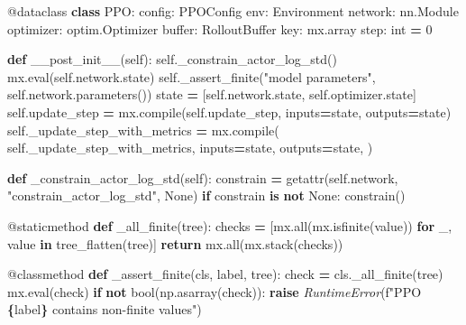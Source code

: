 \documentclass[
  chinese,
  11pt,
  letterpaper,
]{article}
\newenvironment{Shaded}{\begin{snugshade}}{\end{snugshade}}
\newcommand{\AttributeTok}[1]{\textcolor[rgb]{0.13,0.29,0.53}{#1}}
\newcommand{\BuiltInTok}[1]{#1}
\newcommand{\ControlFlowTok}[1]{\textcolor[rgb]{0.13,0.29,0.53}{\textbf{#1}}}
\newcommand{\DecValTok}[1]{\textcolor[rgb]{0.00,0.00,0.81}{#1}}
\newcommand{\KeywordTok}[1]{\textcolor[rgb]{0.13,0.29,0.53}{\textbf{#1}}}
\newcommand{\NormalTok}[1]{#1}
\newcommand{\OperatorTok}[1]{\textcolor[rgb]{0.81,0.36,0.00}{\textbf{#1}}}
\newcommand{\PreprocessorTok}[1]{\textcolor[rgb]{0.56,0.35,0.01}{\textit{#1}}}
\newcommand{\SpecialCharTok}[1]{\textcolor[rgb]{0.81,0.36,0.00}{\textbf{#1}}}
\newcommand{\SpecialStringTok}[1]{\textcolor[rgb]{0.31,0.60,0.02}{#1}}
\newcommand{\StringTok}[1]{\textcolor[rgb]{0.31,0.60,0.02}{#1}}
\newcommand{\VariableTok}[1]{\textcolor[rgb]{0.00,0.00,0.00}{#1}}
\renewenvironment{Shaded}{\par\smallskip}{\par\smallskip}
\begin{document}
\begin{Shaded}
\begin{Highlighting}[]
\AttributeTok{@dataclass}
\KeywordTok{class}\NormalTok{ PPO:}
\NormalTok{    config: PPOConfig}
\NormalTok{    env: Environment}
\NormalTok{    network: nn.Module}
\NormalTok{    optimizer: optim.Optimizer}
    \BuiltInTok{buffer}\NormalTok{: RolloutBuffer}
\NormalTok{    key: mx.array}
\NormalTok{    step: }\BuiltInTok{int} \OperatorTok{=} \DecValTok{0}

    \KeywordTok{def}\NormalTok{ \_\_post\_init\_\_(}\VariableTok{self}\NormalTok{):}
        \VariableTok{self}\NormalTok{.\_constrain\_actor\_log\_std()}
\NormalTok{        mx.}\BuiltInTok{eval}\NormalTok{(}\VariableTok{self}\NormalTok{.network.state)}
        \VariableTok{self}\NormalTok{.\_assert\_finite(}\StringTok{"model parameters"}\NormalTok{, }\VariableTok{self}\NormalTok{.network.parameters())}
\NormalTok{        state }\OperatorTok{=}\NormalTok{ [}\VariableTok{self}\NormalTok{.network.state, }\VariableTok{self}\NormalTok{.optimizer.state]}
        \VariableTok{self}\NormalTok{.update\_step }\OperatorTok{=}\NormalTok{ mx.}\BuiltInTok{compile}\NormalTok{(}\VariableTok{self}\NormalTok{.update\_step, inputs}\OperatorTok{=}\NormalTok{state, outputs}\OperatorTok{=}\NormalTok{state)}
        \VariableTok{self}\NormalTok{.\_update\_step\_with\_metrics }\OperatorTok{=}\NormalTok{ mx.}\BuiltInTok{compile}\NormalTok{(}
            \VariableTok{self}\NormalTok{.\_update\_step\_with\_metrics,}
\NormalTok{            inputs}\OperatorTok{=}\NormalTok{state,}
\NormalTok{            outputs}\OperatorTok{=}\NormalTok{state,}
\NormalTok{        )}

    \KeywordTok{def}\NormalTok{ \_constrain\_actor\_log\_std(}\VariableTok{self}\NormalTok{):}
\NormalTok{        constrain }\OperatorTok{=} \BuiltInTok{getattr}\NormalTok{(}\VariableTok{self}\NormalTok{.network, }\StringTok{"constrain\_actor\_log\_std"}\NormalTok{, }\VariableTok{None}\NormalTok{)}
        \ControlFlowTok{if}\NormalTok{ constrain }\KeywordTok{is} \KeywordTok{not} \VariableTok{None}\NormalTok{:}
\NormalTok{            constrain()}

    \AttributeTok{@staticmethod}
    \KeywordTok{def}\NormalTok{ \_all\_finite(tree):}
\NormalTok{        checks }\OperatorTok{=}\NormalTok{ [mx.}\BuiltInTok{all}\NormalTok{(mx.isfinite(value)) }\ControlFlowTok{for}\NormalTok{ \_, value }\KeywordTok{in}\NormalTok{ tree\_flatten(tree)]}
        \ControlFlowTok{return}\NormalTok{ mx.}\BuiltInTok{all}\NormalTok{(mx.stack(checks))}

    \AttributeTok{@classmethod}
    \KeywordTok{def}\NormalTok{ \_assert\_finite(cls, label, tree):}
\NormalTok{        check }\OperatorTok{=}\NormalTok{ cls.\_all\_finite(tree)}
\NormalTok{        mx.}\BuiltInTok{eval}\NormalTok{(check)}
        \ControlFlowTok{if} \KeywordTok{not} \BuiltInTok{bool}\NormalTok{(np.asarray(check)):}
            \ControlFlowTok{raise} \PreprocessorTok{RuntimeError}\NormalTok{(}\SpecialStringTok{f"PPO }\SpecialCharTok{\{}\NormalTok{label}\SpecialCharTok{\}}\SpecialStringTok{ contains non{-}finite values"}\NormalTok{)}


\end{Highlighting}
\end{Shaded}
\end{document}
